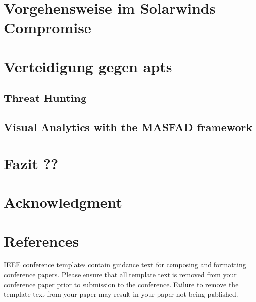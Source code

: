 \documentclass[conference]{IEEEtran}
\begin{document}
\section{Vorgehensweise im Solarwinds Compromise}

\section{Verteidigung gegen \aclp{apt}}
\subsection{Threat Hunting}
\subsection{Visual Analytics with the MASFAD framework}
\section{Fazit ??}

\section*{Acknowledgment}

\section*{References}

\balance





\vspace{12pt}
\color{red}
IEEE conference templates contain guidance text for composing and formatting conference papers. Please ensure that all template text is removed from your conference paper prior to submission to the conference. Failure to remove the template text from your paper may result in your paper not being published.
\end{document}
